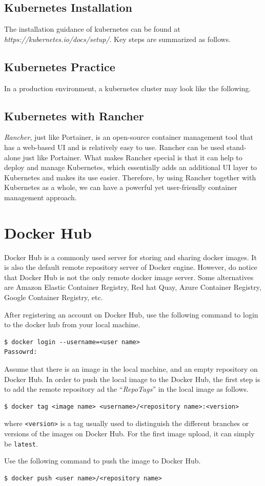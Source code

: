 \subsection{Kubernetes Installation}

The installation guidance of kubernetes can be found at \textit{https://kubernetes.io/docs/setup/}. Key steps are summarized as follows.

\subsection{Kubernetes Practice}


In a production environment, a kubernetes cluster may look like the following.

\subsection{Kubernetes with Rancher}

\textit{Rancher}, just like Portainer, is an open-source container management tool that has a web-based UI and is relatively easy to use. Rancher can be used stand-alone just like Portainer. What makes Rancher special is that it can help to deploy and manage Kubernetes, which essentially adds an additional UI layer to Kubernetes and makes its use easier. Therefore, by using Rancher together with Kubernetes as a whole, we can have a powerful yet user-friendly container management approach.

\section{Docker Hub}

Docker Hub is a commonly used server for storing and sharing docker images. It is also the default remote repository server of Docker engine. However, do notice that Docker Hub is not the only remote docker image server. Some alternatives are Amazon Elastic Container Registry, Red hat Quay, Azure Container Registry, Google Container Registry, etc.

After registering an account on Docker Hub, use the following command to login to the docker hub from your local machine.
\begin{lstlisting}
$ docker login --username=<user name>
Passowrd:
\end{lstlisting}

Assume that there is an image in the local machine, and an empty repository on Docker Hub. In order to push the local image to the Docker Hub, the first step is to add the remote repository ad the ``\textit{RepoTags}'' in the local image as follows.
\begin{lstlisting}
$ docker tag <image name> <username>/<repository name>:<version>
\end{lstlisting}
where \verb|<version>| is a tag usually used to distinguish the different branches or versions of the images on Docker Hub. For the first image upload, it can simply be \verb|latest|.

Use the following command to push the image to Docker Hub.
\begin{lstlisting}
$ docker push <user name>/<repository name>
\end{lstlisting}




